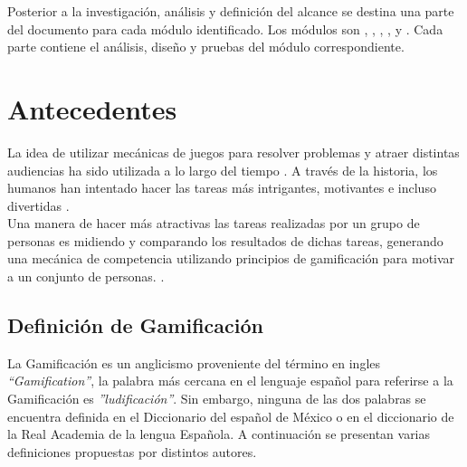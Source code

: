  \noindent Posterior a la investigación, análisis y definición del alcance se destina una parte del documento para cada módulo identificado. Los módulos son , , , ,  y . Cada parte contiene el análisis, diseño y pruebas del módulo correspondiente.

 \clearpage

\section{Antecedentes} \label{sec:antecedentes}

 La idea de utilizar mecánicas de juegos para resolver problemas y atraer distintas audiencias ha sido utilizada a lo largo del tiempo \cite{GamByDesign}. A través de la historia, los humanos han intentado hacer las tareas más intrigantes, motivantes e incluso divertidas \cite{Octalysis}.\\

 \noindent Una manera de hacer más atractivas las tareas realizadas por un grupo de personas es
 midiendo y comparando los resultados de dichas tareas, generando una mecánica de competencia utilizando
 principios de gamificación para motivar a un conjunto de personas. \cite[p. 7]{Octalysis}.

\subsection{Definición de Gamificación}

 La Gamificación es un anglicismo proveniente del término en ingles {\it ``Gamification''}, la palabra más cercana en el lenguaje español para referirse a la Gamificación es {\it ''ludificación''}. Sin embargo, ninguna de las dos palabras se encuentra definida en el Diccionario del español de México o en el diccionario de la Real Academia de la lengua Española. A continuación se presentan varias definiciones propuestas por distintos autores.


